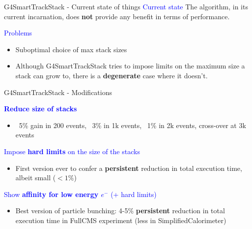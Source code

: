 \documentclass{beamer}
\begin{document}
\begin{frame}{G4SmartTrackStack - Current state of things}
\textcolor{blue}{Current state}
The algorithm, in its current incarnation, does {\bf not} provide any benefit in
terms of performance.

\vspace{5mm}

\textcolor{blue}{Problems}
\begin{itemize}
\item Suboptimal choice of max stack sizes
\item Although G4SmartTrackStack tries to impose limits on the maximum size a
stack can grow to, there is a {\bf degenerate} case where it doesn't.
\end{itemize}
\end{frame}

\begin{frame}{G4SmartTrackStack - Modifications}

\textcolor{blue}{{\bf Reduce size of stacks}}
\begin{itemize}
\item ~5\% gain in 200 events, ~3\% in 1k events, ~1\% in 2k events, cross-over at 3k events
\end{itemize}
\textcolor{blue}{Impose {\bf hard limits} on the size of the stacks}
\begin{itemize}
\item First version ever to confer a {\bf persistent} reduction in total execution time, albeit small ($<1\%$)
\end{itemize}
\textcolor{blue}{Show {\bf affinity for low energy $e^-$} (+ hard limits)}
\begin{itemize}
\item Best version of particle bunching: 4-5\% {\bf persistent} reduction in total execution time
in FullCMS experiment (less in SimplifiedCalorimeter)
\end{itemize}
\end{frame}
\end{document}
